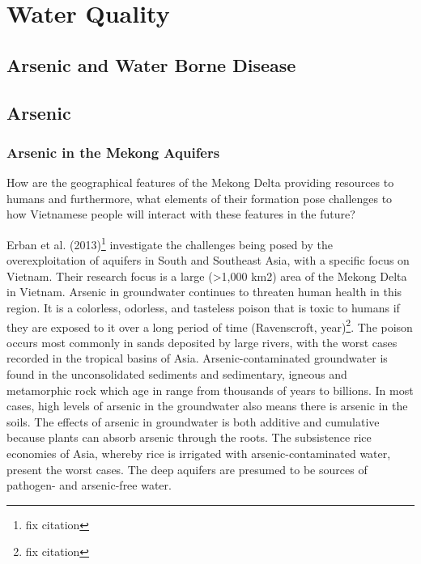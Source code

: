 \chapter{Water Quality}\label{ch:water_quality}


\section{Arsenic and Water Borne Disease}



\section{Arsenic}

\subsection{Arsenic in the Mekong Aquifers}

How are the geographical features of the Mekong Delta providing resources to humans and furthermore, what elements of their formation pose challenges to how Vietnamese people will interact with these features in the future?

Erban et al. (2013)\footnote{fix citation} investigate the challenges being posed by the overexploitation of aquifers in South and Southeast Asia, with a specific focus on Vietnam. Their research focus is a large (>1,000 km2)  area of the Mekong Delta in Vietnam. Arsenic in groundwater continues to threaten human health in this region. It is a colorless, odorless, and tasteless poison that is toxic to humans if they are exposed to it over a long period of time (Ravenscroft, year)\footnote{fix citation}. The poison occurs most commonly in sands deposited by large rivers, with the worst cases recorded in the tropical basins of Asia. Arsenic-contaminated groundwater is found in the unconsolidated sediments and sedimentary, igneous and metamorphic rock which age in range from thousands of years to billions. In most cases, high levels of arsenic in the groundwater also means there is arsenic in the soils. The effects of arsenic in groundwater is both additive and cumulative because plants can absorb arsenic through the roots. The subsistence rice economies of Asia, whereby rice is irrigated with arsenic-contaminated water, present the worst cases. The deep aquifers are presumed to be sources of pathogen- and arsenic-free water. 

